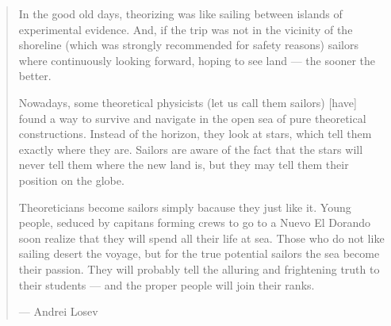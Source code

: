 
\cleardoublepage
\thispagestyle{empty}
{}

\vspace*{3cm}

\begin{quotation}

   \openquote In the good old days, theorizing was like sailing between islands of
   experimental evidence. And, if the trip was not in the vicinity of the
   shoreline (which was strongly recommended for safety reasons) sailors where
   continuously looking forward, hoping to see land --- the sooner the better.
   
   Nowadays, some theoretical physicists (let us call them sailors) [have]
   found a way to survive and navigate in the open sea of pure theoretical
   constructions. Instead of the horizon, they look at stars, which tell them
   exactly where they are. Sailors are aware of the fact that the stars will
   never tell them where the new land is, but they may tell them their position
   on the globe. 

   Theoreticians become sailors simply bacause they just like it. Young people,
   seduced by capitans forming crews to go to a Nuevo El Dorando \textelp{} soon
   realize that they will spend all their life at sea. Those who do not like
   sailing desert the voyage, but for the true potential sailors the sea become
   their passion. They will probably tell the alluring and frightening truth to
   their students --- and the proper people will join their ranks.~\closequote

   \begin{flushright}
      ---  Andrei Losev
   \end{flushright}

\end{quotation}

\medskip











